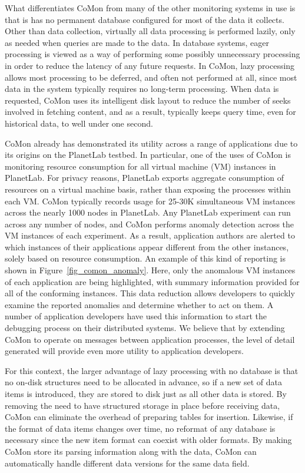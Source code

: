What differentiates CoMon from many of the other monitoring systems in
use is that is has no permanent database configured for most of the
data it collects. Other than data collection, virtually all data
processing is performed lazily, only as needed when queries are made
to the data. In database systems, eager processing is viewed as a way
of performing some possibly unnecessary processing in order to reduce
the latency of any future requests. In CoMon, lazy processing allows
most processing to be deferred, and often not performed at all, since
most data in the system typically requires no long-term processing.
When data is requested, CoMon uses its intelligent disk layout to
reduce the number of seeks involved in fetching content, and as a
result, typically keeps query time, even for historical data, to well
under one second.

CoMon already has demonstrated its utility across a range of
applications due to its origins on the PlanetLab testbed. In
particular, one of the uses of CoMon is monitoring resource
consumption for all virtual machine (VM) instances in PlanetLab. For
privacy reasons, PlanetLab exports aggregate consumption of resources
on a virtual machine basis, rather than exposing the processes within
each VM. CoMon typically records usage for 25-30K simultaneous VM
instances across the nearly 1000 nodes in PlanetLab. Any PlanetLab
experiment can run across any number of nodes, and CoMon performs
anomaly detection across the VM instances of each experiment. As a
result, application authors are alerted to which instances of their
applications appear different from the other instances, solely based
on resource consumption. An example of this kind of reporting is shown
in Figure~\ref{fig_comon_anomaly}. Here, only the anomalous VM
instances of each application are being highlighted, with summary
information provided for all of the conforming instances. This data
reduction allows developers to quickly examine the reported anomalies
and determine whether to act on them. A number of application
developers have used this information to start the debugging process
on their distributed systems. We believe that by extending CoMon to
operate on messages between application processes, the level of detail
generated will provide even more utility to application developers.

For this context, the larger advantage of lazy processing with no
database is that no on-disk structures need to be allocated in
advance, so if a new set of data items is introduced, they are stored
to disk just as all other data is stored. By removing the need to have
structured storage in place before receiving data, CoMon can eliminate
the overhead of preparing tables for insertion. Likewise, if the
format of data items changes over time, no reformat of any database is
necessary since the new item format can coexist with older formats. By
making CoMon store its parsing information along with the data, CoMon
can automatically handle different data versions for the same data
field.

